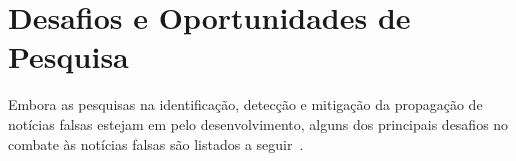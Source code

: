 \documentclass{SBCbookchapter}
\begin{document}





\section{Desafios e Oportunidades de Pesquisa}
\label{sec:desafios}

Embora as pesquisas na identificação, detecção e mitigação da propagação de notícias falsas estejam em pelo desenvolvimento, alguns dos principais desafios no combate às notícias falsas são listados a seguir~\cite{sharma2019combating}.
\end{document}
